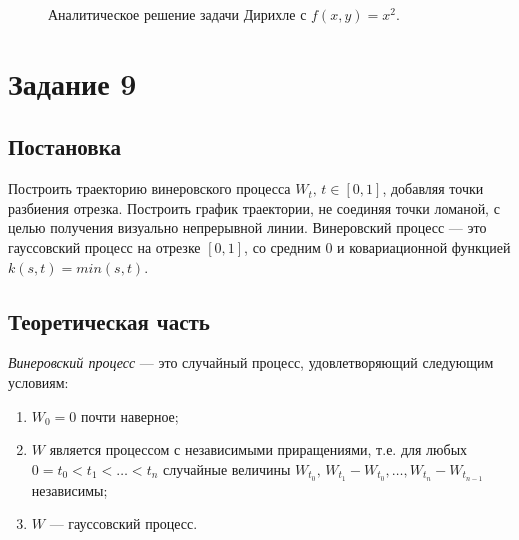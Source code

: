 \documentclass[12pt, a4paper]{article}
\begin{document}
\begin{figure}[H]
\begin{center}
\end{center}
\caption{Аналитическое решение задачи Дирихле с $f(x,y)=x^2$.}
\end{figure}

\newpage

\section{Задание 9}
\subsection{Постановка}
Построить траекторию винеровского процесса $W_t,\,t\in[0,1]$, добавляя точки разбиения отрезка. Построить график траектории, не соединяя точки ломаной, с целью получения визуально непрерывной линии. Винеровский процесс --- это гауссовский процесс на отрезке $[0,1]$, со средним $0$ и ковариационной функцией $k(s,t) = min(s,t)$.

\subsection{Теоретическая часть}
\begin{df}
	\textit{Винеровский процесс} --- это случайный процесс, удовлетворяющий следующим условиям:
	\begin{enumerate}
		\item $W_0 = 0$ почти наверное;
		\item $W$ является процессом с независимыми приращениями, т.е. для любых $0=t_0<t_1<\dots<t_n$ случайные величины $W_{t_0},\,W_{t_1}-W_{t_0},\dots,W_{t_n}-W_{t_{n-1}}$ независимы;
		\item $W$ --- гауссовский процесс.
	\end{enumerate}
\end{df}
\end{document}
